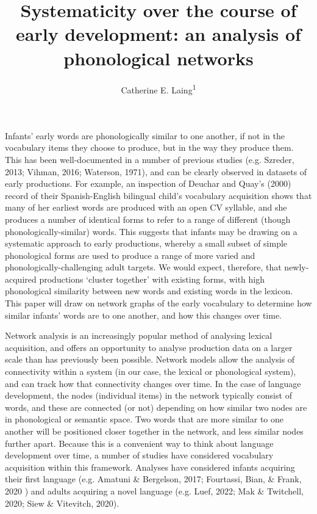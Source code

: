 \documentclass[
  man]{apa6}
\title{Systematicity over the course of early development: an analysis of phonological networks}
\author{Catherine E. Laing\textsuperscript{1}}
\date{}
\affiliation{\vspace{0.5cm}\textsuperscript{1} University of York, York, UK}
\begin{document}
\maketitle

Infants' early words are phonologically similar to one another, if not in the vocabulary items they choose to produce, but in the way they produce them. This has been well-documented in a number of previous studies (e.g. Szreder, 2013; Vihman, 2016; Waterson, 1971), and can be clearly observed in datasets of early productions. For example, an inspection of Deuchar and Quay's (2000) record of their Spanish-English bilingual child's vocabulary acquisition shows that many of her earliest words are produced with an open CV syllable, and she produces a number of identical forms to refer to a range of different (though phonologically-similar) words. This suggests that infants may be drawing on a systematic approach to early productions, whereby a small subset of simple phonological forms are used to produce a range of more varied and phonologically-challenging adult targets. We would expect, therefore, that newly-acquired productions `cluster together' with existing forms, with high phonological similarity between new words and existing words in the lexicon. This paper will draw on network graphs of the early vocabulary to determine how similar infants' words are to one another, and how this changes over time.

Network analysis is an increasingly popular method of analysing lexical acquisition, and offers an opportunity to analyse production data on a larger scale than has previously been possible. Network models allow the analysis of connectivity within a system (in our case, the lexical or phonological system), and can track how that connectivity changes over time. In the case of language development, the nodes (individual items) in the network typically consist of words, and these are connected (or not) depending on how similar two nodes are in phonological or semantic space. Two words that are more similar to one another will be positioned closer together in the network, and less similar nodes further apart. Because this is a convenient way to think about language development over time, a number of studies have considered vocabulary acquisition within this framework. Analyses have considered infants acquiring their first language (e.g. Amatuni \& Bergelson, 2017; Fourtassi, Bian, \& Frank, 2020 ) and adults acquiring a novel language (e.g. Luef, 2022; Mak \& Twitchell, 2020; Siew \& Vitevitch, 2020).
\end{document}

